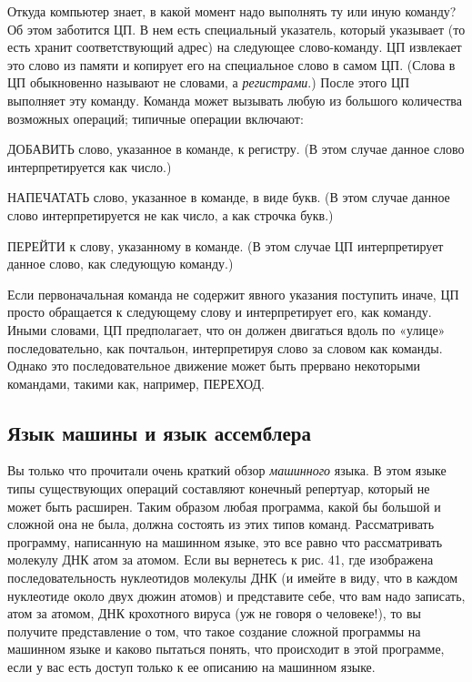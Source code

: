 \documentclass[../main.tex]{subfiles}
\begin{document}
Откуда компьютер знает, в какой момент надо выполнять ту или иную команду? Об этом заботится ЦП. В нем есть специальный указатель, который указывает (то есть хранит соответствующий адрес) на следующее слово-команду. ЦП извлекает это слово из памяти и копирует его на специальное слово в самом ЦП. (Слова в ЦП обыкновенно называют не словами, а \emph{регистрами}.) После этого ЦП выполняет эту команду. Команда может вызывать любую из большого количества возможных операций; типичные операции включают:

ДОБАВИТЬ слово, указанное в команде, к регистру. (В этом случае данное слово интерпретируется как число.)

НАПЕЧАТАТЬ слово, указанное в команде, в виде букв. (В этом случае данное слово интерпретируется не как число, а как строчка букв.)

ПЕРЕЙТИ к слову, указанному в команде. (В этом случае ЦП интерпретирует данное слово, как следующую команду.)

Если первоначальная команда не содержит явного указания поступить иначе, ЦП просто обращается к следующему слову и интерпретирует его, как команду. Иными словами, ЦП предполагает, что он должен двигаться вдоль по «улице» последовательно, как почтальон, интерпретируя слово за словом как команды. Однако это последовательное движение может быть прервано некоторыми командами, такими как, например, ПЕРЕХОД.


\subsection{Язык машины и язык ассемблера}

Вы только что прочитали очень краткий обзор \emph{машинного} языка. В этом языке типы существующих операций составляют конечный репертуар, который не может быть расширен. Таким образом любая программа, какой бы большой и сложной она не была, должна состоять из этих типов команд. Рассматривать программу, написанную на машинном языке, это все равно что рассматривать молекулу ДНК атом за атомом. Если вы вернетесь к рис. 41, где изображена последовательность нуклеотидов молекулы ДНК (и имейте в виду, что в каждом нуклеотиде около двух дюжин атомов) и представите себе, что вам надо записать, атом за атомом, ДНК крохотного вируса (уж не говоря о человеке!), то вы получите представление о том, что такое создание сложной программы на машинном языке и каково пытаться понять, что происходит в этой программе, если у вас есть доступ только к ее описанию на машинном языке.
\end{document}
